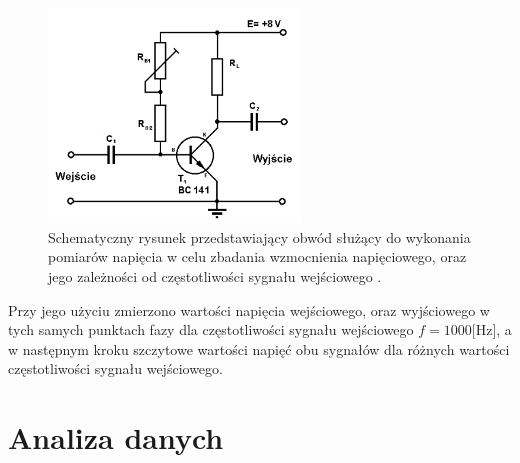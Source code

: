 \documentclass[10pt,a4paper]{article}
\begin{document}
\begin{figure}[ht!]	
	\begin{center}
		\includegraphics[width = 0.6\textwidth]{obwod2.png}
		\caption{Schematyczny rysunek przedstawiający obwód służący do wykonania pomiarów napięcia w celu zbadania wzmocnienia napięciowego, oraz jego zależności od częstotliwości sygnału wejściowego \cite{schematy}.}
		\label{obwod2}
	\end{center}
\end{figure}	
Przy jego użyciu zmierzono wartości napięcia wejściowego, oraz wyjściowego w tych samych punktach fazy dla częstotliwości sygnału wejściowego $f = 1000 \text{[Hz]}$, a w następnym kroku szczytowe wartości napięć obu sygnałów dla różnych wartości częstotliwości sygnału wejściowego.

\section*{Analiza danych}
\end{document}
